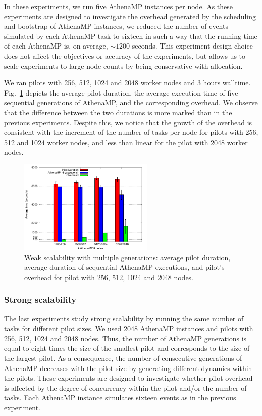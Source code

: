 \documentclass[conference]{IEEEtran}
\begin{document}
In these experiments, we run five AthenaMP instances per node.  As these
experiments are designed to investigate the overhead generated by the scheduling
and bootstrap of AthenaMP instances, we reduced the number of events simulated
by each AthenaMP task to sixteen in such a way that the running time of each
AthenaMP is, on average, $\sim 1200$ seconds. This experiment design choice does
not affect the  objectives or accuracy of the experiments, but allows us to
scale experiments to large node counts by being conservative with allocation.

We ran pilots with 256, 512, 1024 and 2048 worker nodes and 3 hours
walltime. Fig.~\ref{fig:weakScal2a} depicts the average pilot duration, the
average execution time of five sequential generations of AthenaMP, and the
corresponding overhead. We observe that the difference between the two durations
is more marked than in the previous experiments. Despite this, we notice that
the growth of the overhead is consistent with the increment of the number of
tasks per node for pilots with 256, 512 and 1024 worker nodes, and less than
linear for the pilot with 2048 worker nodes.

\begin{figure}[!t]
        \includegraphics[height=4.5cm,width=\columnwidth]{weak2.pdf}
    \caption{Weak scalability with multiple generations: average pilot
    duration, average duration of sequential AthenaMP executions, and
    pilot's overhead for pilot with 256, 512, 1024 and 2048 nodes.}
\label{fig:weakScal2a}
\end{figure}


\subsubsection{Strong scalability}

The last experiments  study strong scalability by running the same number of
tasks for different pilot sizes. We used 2048 AthenaMP instances and  pilots
with 256, 512, 1024 and 2048 nodes. Thus, the number of AthenaMP generations is
equal to eight times the size of the smallest pilot and corresponds to the size
of the largest pilot. As a consequence, the number of consecutive generations of
AthenaMP decreases with the pilot size by generating different dynamics within
the pilots. These experiments are designed to investigate whether pilot overhead
is affected by the degree of concurrency within the pilot and/or the number of
tasks. Each AthenaMP instance simulates sixteen events as in the previous
experiment.
\end{document}
